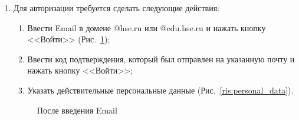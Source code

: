 \documentclass{../includes/TechDoc}
\begin{document}
\begin{enumerate}
        \newpage
        \item Для авторизации требуется сделать следующие действия:
        \begin{enumerate}
            \item Ввести Email в домене @hse.ru или @edu.hse.ru и нажать кнопку <<Войти>> (Рис.~\ref{ris:login_code});
            \item Ввести код подтверждения, который был отправлен на указанную почту и нажать кнопку <<Войти>>;
            \item Указать действительные персональные данные (Рис.~\ref{ris:personal_data}).
        \end{enumerate}
        \begin{figure}[h]
            \begin{center}
                \begin{minipage}[ht]{0.4\linewidth}
                    \caption{После введения Email} %
                    \label{ris:login_code} %
                \end{minipage}
                \hfill
                \begin{minipage}[ht]{0.4\linewidth}

\end{minipage}
\end{center}
\end{figure}
\end{enumerate}
\end{document}
